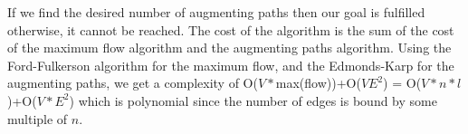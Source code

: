 If we find the desired number of augmenting paths then our goal is fulfilled otherwise, it cannot be reached. The cost of the algorithm is the sum of the cost of the maximum flow algorithm and the augmenting paths algorithm. Using the Ford-Fulkerson algorithm for the maximum flow, and the Edmonds-Karp for the augmenting paths, we get a complexity of O($V*$max(flow))+O($VE^2$) = O($V*n*l$)+O($V*E^2$) which is polynomial since the number of edges is bound by some multiple of $n$.

